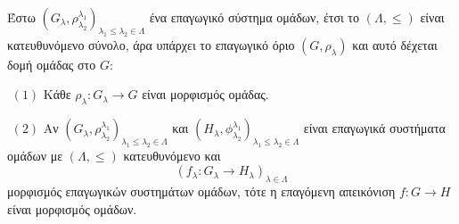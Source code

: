 \begin{theorem} Έστω $(G_{\lambda},\rho^{\lambda_1}_{\lambda_2})_{\lambda_1 \leq \lambda_2 \in \Lambda}$ ένα επαγωγικό σύστημα ομάδων, έτσι το $(\Lambda,\leq)$  είναι κατευθυνόμενο σύνολο, άρα υπάρχει το επαγωγικό όριο $(G,\rho_{\lambda})$ και αυτό δέχεται δομή ομάδας στο $G$:

    $ $\newline
    $(1)$ Κάθε $\rho_{\lambda}: G_{\lambda} \rightarrow G$ είναι μορφισμός ομάδας.

    $ $\newline
    $(2)$ Αν $(G_{\lambda},\rho^{\lambda_1}_{\lambda_2})_{\lambda_1 \leq \lambda_2 \in \Lambda}$ και $(H_{\lambda},\phi^{\lambda_1}_{\lambda_2})_{\lambda_1 \leq \lambda_2 \in \Lambda}$ είναι επαγωγικά συστήματα ομάδων με $(\Lambda,\leq)$  κατευθυνόμενο και 
    $$(f_{\lambda}:G_{\lambda} \rightarrow H_{\lambda})_{\lambda \in \Lambda}$$ μορφισμός επαγωγικών συστημάτων ομάδων, τότε η επαγόμενη απεικόνιση $f:G\rightarrow H$ είναι μορφισμός ομάδων.
\end{theorem}

